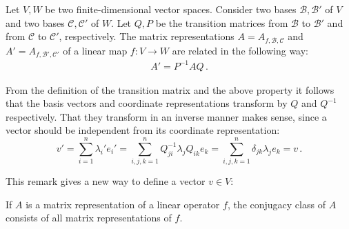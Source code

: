    \begin{result}\label{linalgebra:transition_matrix_representation}
        Let $V,W$ be two finite-dimensional vector spaces. Consider two bases $\mathcal{B},\mathcal{B}'$ of $V$ and two bases $\mathcal{C},\mathcal{C}'$ of $W$. Let $Q,P$ be the transition matrices from $\mathcal{B}$ to $\mathcal{B}'$ and from $\mathcal{C}$ to $\mathcal{C}'$, respectively. The matrix representations $A=A_{f,\mathcal{B},\mathcal{C}}$ and $A'=A_{f,\mathcal{B}',\mathcal{C}'}$ of a linear map $f:V\rightarrow W$ are related in the following way:
        \begin{gather}
            A' = P^{-1}AQ\,.
        \end{gather}
    \end{result}

    \begin{remark}
        From the definition of the transition matrix and the above property it follows that the basis vectors and coordinate representations transform by $Q$ and $Q^{-1}$ respectively. That they transform in an inverse manner makes sense, since a vector should be independent from its coordinate representation: \[v'=\sum_{i=1}^n\lambda_i'e_i'=\sum_{i,j,k=1}^nQ^{-1}_{ji}\lambda_jQ_{ik}e_k = \sum_{i,j,k=1}^n\delta_{jk}\lambda_je_k = v\,.\]
    \end{remark}
    This remark gives a new way to define a vector $v\in V$:

    \begin{remark}
        If $A$ is a matrix representation of a linear operator $f$, the conjugacy class of $A$ consists of all matrix representations of $f$.
    \end{remark}

